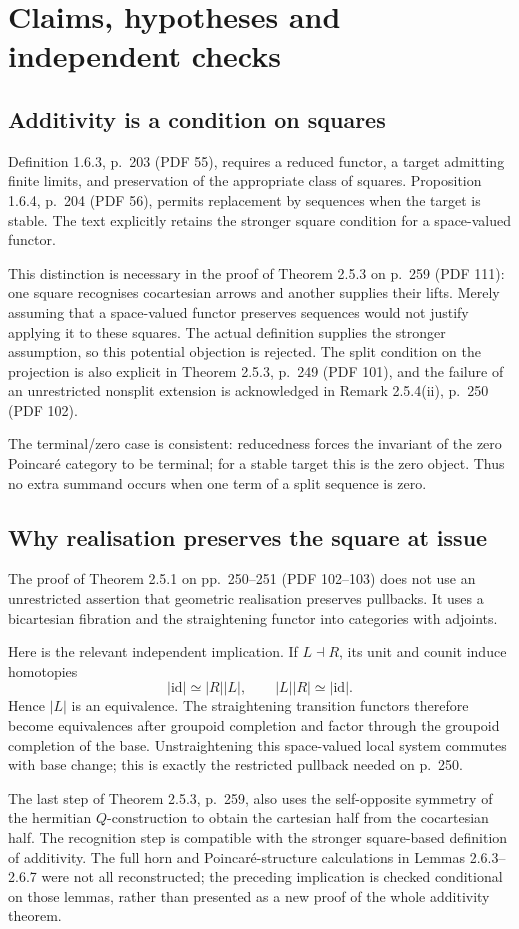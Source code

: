 \documentclass[10pt]{article}
\begin{document}
\section*{Claims, hypotheses and independent checks}
\subsection*{Additivity is a condition on squares}
Definition 1.6.3, p. 203 (PDF 55), requires a reduced functor, a target admitting finite limits, and preservation of the appropriate class of squares. Proposition 1.6.4, p. 204 (PDF 56), permits replacement by sequences when the target is stable. The text explicitly retains the stronger square condition for a space-valued functor.\par
This distinction is necessary in the proof of Theorem 2.5.3 on p. 259 (PDF 111): one square recognises cocartesian arrows and another supplies their lifts. Merely assuming that a space-valued functor preserves sequences would not justify applying it to these squares. The actual definition supplies the stronger assumption, so this potential objection is rejected. The split condition on the projection is also explicit in Theorem 2.5.3, p. 249 (PDF 101), and the failure of an unrestricted nonsplit extension is acknowledged in Remark 2.5.4(ii), p. 250 (PDF 102).\par
The terminal/zero case is consistent: reducedness forces the invariant of the zero Poincaré category to be terminal; for a stable target this is the zero object. Thus no extra summand occurs when one term of a split sequence is zero.\par
\subsection*{Why realisation preserves the square at issue}
The proof of Theorem 2.5.1 on pp. 250–251 (PDF 102–103) does not use an unrestricted assertion that geometric realisation preserves pullbacks. It uses a bicartesian fibration and the straightening functor into categories with adjoints.\par
Here is the relevant independent implication. If \(L\dashv R\), its unit and counit induce homotopies \[|\mathrm{id}|\simeq |R||L|,\qquad |L||R|\simeq|\mathrm{id}|.\] Hence \(|L|\) is an equivalence. The straightening transition functors therefore become equivalences after groupoid completion and factor through the groupoid completion of the base. Unstraightening this space-valued local system commutes with base change; this is exactly the restricted pullback needed on p. 250.\par
The last step of Theorem 2.5.3, p. 259, also uses the self-opposite symmetry of the hermitian \(Q\)-construction to obtain the cartesian half from the cocartesian half. The recognition step is compatible with the stronger square-based definition of additivity. The full horn and Poincaré-structure calculations in Lemmas 2.6.3–2.6.7 were not all reconstructed; the preceding implication is checked conditional on those lemmas, rather than presented as a new proof of the whole additivity theorem.\par
\end{document}
